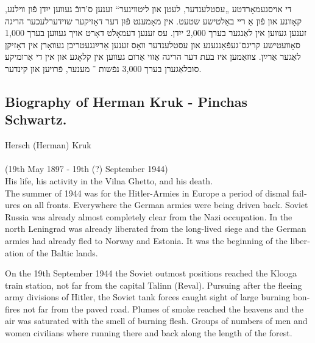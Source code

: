 \documentclass{article}
\begin{document}
\begin{pairs}
\begin{Rightside}
\begin{RTL}
\begin{hebrew}
די אויסגעמאָרדטע „עסטלענדער, לעטן און ליטװינער“ זענען ס'רובֿ געװען
ייִדן פֿון װילנע, קאָװנע און פֿון אַ רײ באַלטישע שטעט. אין מאָמענט פֿוּן דער
דאָזיקער שוידערלעכער הריגה זענען געװען אין לאַנגער בערך 2,000 ייִדן. עס
זענען דעמאָלט דאָרט אויך געװען בערך 1,000 סאָװעטישע קריגס־געפֿאַנגענע און
עסטלענדער װאָס זענען אַרײַנגעטריבן געװאָרן אין דאָזיקן לאַגער אַרײַן.
צוזאַמען איז בעת דער הריגה אַזוי אַרום געװען אין קלאָגע און אין די אַרומיקע
סובלאַגערן בערך 3,000 נפֿשות ־ מענער, פֿרויען און קינדער.

\endnumbering
\end{hebrew}
\end{RTL}
\end{Rightside}


\begin{Leftside}
\begin{english}
\section{
Biography of Herman Kruk - Pinchas Schwartz. \\    }
\beginnumbering
\autopar

Hersch (Herman) Kruk \\ \\ (19th May 1897 - 19th (?) September 1944) \\ 

His life, his activity in the Vilna Ghetto, and his death. \\

The summer of 1944 was for the Hitler-Armies in Europe a period
of dismal failures on all fronts. Everywhere the German armies 
were being driven back. Soviet Russia was already almost completely
clear from the Nazi occupation. In the north Leningrad was already
liberated from the long-lived siege and the German armies had already
fled to Norway and Estonia. It was the beginning of the liberation of the Baltic
lands.

On the 19th September 1944 the Soviet outmost positions reached the Klooga train station,
not far from the capital Talinn (Reval). Pursuing after the fleeing army divisions of Hitler, the
Soviet tank forces caught sight of large burning bonfires not far from the paved road.  Plumes
of smoke reached the heavens and the air was saturated with the smell of burning flesh. Groups of numbers of
men and women civilians where running there and back along the length of the forest.


\end{english}
\end{Leftside}
\end{pairs}
\end{document}

